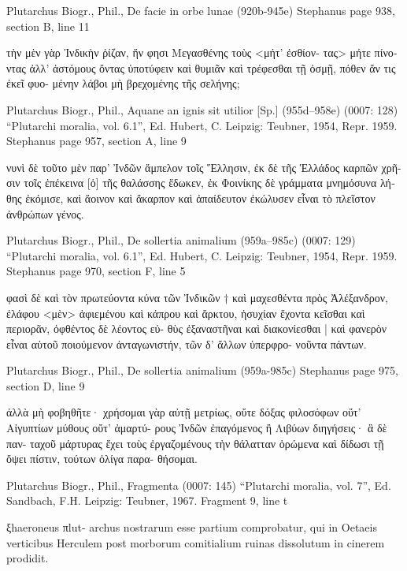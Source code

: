 \documentclass[12pt,letterpaper,twoside,final]{memoir}
\begin{document}
\begin{greek}
Plutarchus Biogr., Phil., De facie in orbe lunae (920b-945e) 
Stephanus page 938, section B, line 11

                                                  τὴν μὲν γὰρ 
Ἰνδικὴν ῥίζαν, ἥν φησι Μεγασθένης τοὺς <μήτ' ἐσθίον-
τας> μήτε πίνοντας ἀλλ' ἀστόμους ὄντας ὑποτύφειν καὶ 
θυμιᾶν καὶ τρέφεσθαι τῇ ὀσμῇ, πόθεν ἄν τις ἐκεῖ φυο-
μένην λάβοι μὴ βρεχομένης τῆς σελήνης; 



Plutarchus Biogr., Phil., Aquane an ignis sit utilior [Sp.] (955d–958e) (0007: 128)
“Plutarchi moralia, vol. 6.1”, Ed. Hubert, C.
Leipzig: Teubner, 1954, Repr. 1959.
Stephanus page 957, section A, line 9

                           νυνὶ δὲ τοῦτο μὲν παρ' Ἰνδῶν 
ἄμπελον τοῖς Ἕλλησιν, ἐκ δὲ τῆς Ἑλλάδος καρπῶν χρῆ-
σιν τοῖς ἐπέκεινα [ὁ] τῆς θαλάσσης ἔδωκεν, ἐκ Φοινίκης 
δὲ γράμματα μνημόσυνα λήθης ἐκόμισε, καὶ ἄοινον καὶ 
ἄκαρπον καὶ ἀπαίδευτον ἐκώλυσεν εἶναι τὸ πλεῖστον 
ἀνθρώπων γένος. 



Plutarchus Biogr., Phil., De sollertia animalium (959a–985c) (0007: 129)
“Plutarchi moralia, vol. 6.1”, Ed. Hubert, C.
Leipzig: Teubner, 1954, Repr. 1959.
Stephanus page 970, section F, line 5

                                  φασὶ δὲ καὶ τὸν πρωτεύοντα 
κύνα τῶν Ἰνδικῶν † καὶ μαχεσθέντα πρὸς Ἀλέξανδρον, 
ἐλάφου <μὲν> ἀφιεμένου καὶ κάπρου καὶ ἄρκτου, ἡσυχίαν 
ἔχοντα κεῖσθαι καὶ περιορᾶν, ὀφθέντος δὲ λέοντος εὐ-
θὺς ἐξαναστῆναι καὶ διακονίεσθαι | καὶ φανερὸν εἶναι 
αὑτοῦ ποιούμενον ἀνταγωνιστήν, τῶν δ' ἄλλων ὑπερφρο-
νοῦντα πάντων. 



Plutarchus Biogr., Phil., De sollertia animalium (959a-985c) 
Stephanus page 975, section D, line 9

ἀλλὰ μὴ φοβηθῆτε· χρήσομαι γὰρ αὐτῇ μετρίως, οὔτε 
δόξας φιλοσόφων οὔτ' Αἰγυπτίων μύθους οὔτ' ἀμαρτύ-
ρους Ἰνδῶν ἐπαγόμενος ἢ Λιβύων διηγήσεις· ἃ δὲ παν-
ταχοῦ μάρτυρας ἔχει τοὺς ἐργαζομένους τὴν θάλατταν 
ὁρώμενα καὶ δίδωσι τῇ ὄψει πίστιν, τούτων ὀλίγα παρα-
θήσομαι. 



Plutarchus Biogr., Phil., Fragmenta (0007: 145)
“Plutarchi moralia, vol. 7”, Ed. Sandbach, F.H.
Leipzig: Teubner, 1967.
Fragment 9, line t

                                      ξhaeroneus πlut-
archus nostrarum esse partium comprobatur, qui in 
Oetaeis verticibus Herculem post morborum comitialium 
ruinas dissolutum in cinerem prodidit. 
      

\end{greek}
\end{document}

